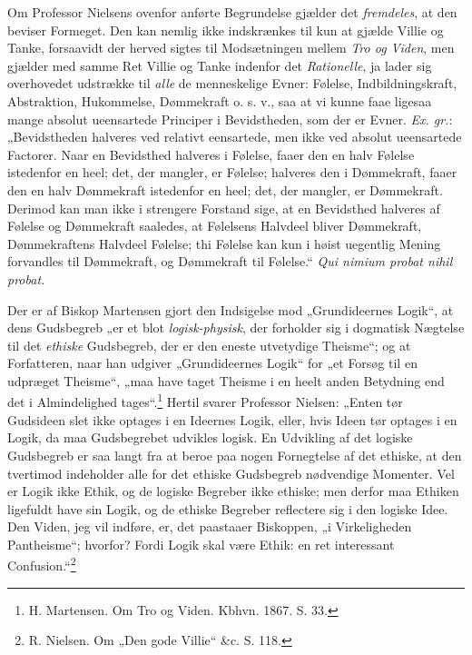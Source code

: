 \documentclass[12pt,a4paper]{book}
\newcommand{\opage}[1]{\marginnote{\footnotesize\textit{[#1]}}}
\begin{document}
Om Professor Nielsens ovenfor anførte Begrundelse
gjælder det \emph{fremdeles}, at den beviser Formeget.
Den kan nemlig ikke indskrænkes til kun at gjælde Villie
og Tanke, forsaavidt der herved sigtes til Modsætningen
mellem \emph{Tro og Viden}, men gjælder med samme Ret
Villie og Tanke indenfor det \emph{Rationelle}, ja lader sig
overhovedet udstrække til \emph{alle} de menneskelige Evner:
Følelse, Indbildningskraft, Abstraktion, Hukommelse, Dømmekraft
o. s. v., saa at vi kunne faae ligesaa mange
absolut ueensartede Principer i Bevidstheden, som der er
Evner. \textit{Ex. gr.}: „Bevidstheden halveres ved relativt
eensartede, men ikke ved absolut ueensartede Factorer.
\opage{48}\setcounter{footnote}{0}%
Naar en Bevidsthed halveres i Følelse, faaer den en
halv Følelse istedenfor en heel; det, der mangler, er
Følelse; halveres den i Dømmekraft, faaer den en halv
Dømmekraft istedenfor en heel; det, der mangler, er
Dømmekraft. Derimod kan man ikke i strengere Forstand
sige, at en Bevidsthed halveres af Følelse og
Dømmekraft saaledes, at Følelsens Halvdeel bliver Dømmekraft,
Dømmekraftens Halvdeel Følelse; thi Følelse
kan kun i høist uegentlig Mening forvandles til Dømmekraft,
og Dømmekraft til Følelse.“ \textit{Qui nimium probat
nihil probat.}

Der er af Biskop Martensen gjort den Indsigelse
mod „Grundideernes Logik“, at dens Gudsbegreb „er et
blot \emph{logisk-physisk}, der forholder sig i dogmatisk
Nægtelse til det \emph{ethiske} Gudsbegreb, der er den eneste
utvetydige Theisme“; og at Forfatteren, naar han udgiver
„Grundideernes Logik“ for „et Forsøg til en udpræget
Theisme“, „maa have taget Theisme i en heelt
anden Betydning end det i Almindelighed tages“.\footnote{H. Martensen. Om Tro og Viden. Kbhvn. 1867. S. 33.}
Hertil svarer Professor Nielsen: „Enten tør Gudsideen
slet ikke optages i en Ideernes Logik, eller, hvis Ideen
tør optages i en Logik, da maa Gudsbegrebet udvikles
logisk. En Udvikling af det logiske Gudsbegreb er saa
langt fra at beroe paa nogen Fornegtelse af det ethiske,
at den tvertimod indeholder alle for det ethiske Gudsbegreb
nødvendige Momenter. Vel er Logik ikke Ethik,
og de logiske Begreber ikke ethiske; men derfor maa
Ethiken ligefuldt have sin Logik, og de ethiske Begreber
\opage{49}\setcounter{footnote}{0}%
reflectere sig i den logiske Idee. Den Viden, jeg vil
indføre, er, det paastaaer Biskoppen, „i Virkeligheden
Pantheisme“; hvorfor? Fordi Logik skal være Ethik:
en ret interessant Confusion.“\footnote{R. Nielsen. Om „Den gode Villie“ \&c. S. 118.}
\end{document}

